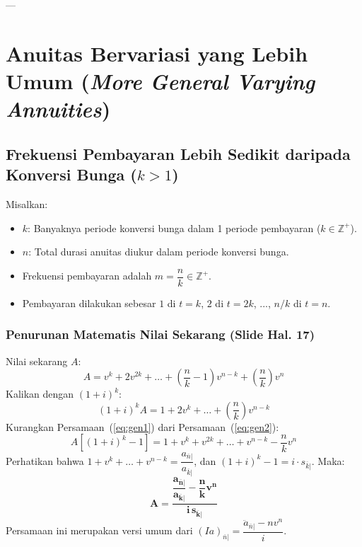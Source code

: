 \documentclass[11pt,a4paper]{article}
\begin{document}
---

\section{Anuitas Bervariasi yang Lebih Umum (\textit{More General Varying Annuities})}

\subsection{Frekuensi Pembayaran Lebih Sedikit daripada Konversi Bunga (\texorpdfstring{$k > 1$}{k > 1})}

Misalkan:
\begin{itemize}
    \item $k$: Banyaknya periode konversi bunga dalam 1 periode pembayaran ($k \in \mathbb{Z}^+$).
    \item $n$: Total durasi anuitas diukur dalam periode konversi bunga.
    \item Frekuensi pembayaran adalah $m = \dfrac{n}{k} \in \mathbb{Z}^+$.
    \item Pembayaran dilakukan sebesar $1$ di $t=k$, $2$ di $t=2k$, ..., $n/k$ di $t=n$.
\end{itemize}

\subsubsection{Penurunan Matematis Nilai Sekarang (Slide Hal. 17)}
Nilai sekarang $A$:
\begin{equation}
    A = v^k + 2 v^{2k} + \dots + \left(\frac{n}{k}-1\right) v^{n-k} + \left(\frac{n}{k}\right) v^n \label{eq:gen1}
\end{equation}
Kalikan dengan $(1+i)^k$:
\begin{equation}
    (1+i)^k A = 1 + 2 v^k + \dots + \left(\frac{n}{k}\right) v^{n-k} \label{eq:gen2}
\end{equation}
Kurangkan Persamaan~(\ref{eq:gen1}) dari Persamaan~(\ref{eq:gen2}):
\begin{equation*}
    A \left[ (1+i)^k - 1 \right] = 1 + v^k + v^{2k} + \dots + v^{n-k} - \frac{n}{k} v^n
\end{equation*}
Perhatikan bahwa $1 + v^k + \dots + v^{n-k} = \dfrac{a_{\overline{n}|}}{a_{\overline{k}|}}$, dan $(1+i)^k - 1 = i \cdot s_{\overline{k}|}$.
Maka:
\begin{equation}
    \mathbf{A = \frac{\dfrac{a_{\overline{n}|}}{a_{\overline{k}|}} - \dfrac{n}{k} v^n}{i \, s_{\overline{k}|}}}
\end{equation}
Persamaan ini merupakan versi umum dari $(Ia)_{\overline{n}|} = \dfrac{\ddot{a}_{\overline{n}|} - n v^n}{i}$.
\end{document}
